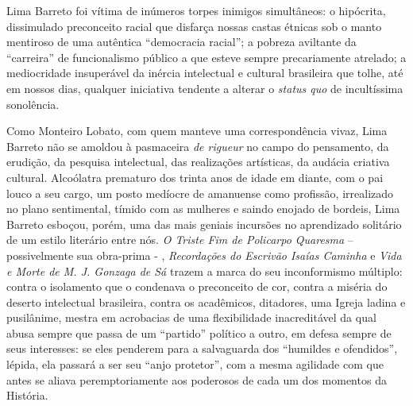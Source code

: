 \documentclass[
  letterpaper,
  DIV=11,
  numbers=noendperiod]{scrreprt}
\begin{document}
Lima Barreto foi vítima de inúmeros torpes inimigos simultâneos: o
hipócrita, dissimulado preconceito racial que disfarça nossas castas
étnicas sob o manto mentiroso de uma autêntica ``democracia racial''; a
pobreza aviltante da ``carreira'' de funcionalismo público a que esteve
sempre precariamente atrelado; a mediocridade insuperável da inércia
intelectual e cultural brasileira que tolhe, até em nossos dias,
qualquer iniciativa tendente a alterar o \emph{status quo} de
incultíssima sonolência.

Como Monteiro Lobato, com quem manteve uma correspondência vivaz, Lima
Barreto não se amoldou à pasmaceira \emph{de rigueur} no campo do
pensamento, da erudição, da pesquisa intelectual, das realizações
artísticas, da audácia criativa cultural. Alcoólatra prematuro dos
trinta anos de idade em diante, com o pai louco a seu cargo, um posto
medíocre de amanuense como profissão, irrealizado no plano sentimental,
tímido com as mulheres e saindo enojado de bordeis, Lima Barreto
esboçou, porém, uma das mais geniais incursões no aprendizado solitário
de um estilo literário entre nós. \emph{O Triste Fim de Policarpo
Quaresma} -- possivelmente sua obra-prima - , \emph{Recordações do
Escrivão Isaías Caminha} e \emph{Vida e Morte de M. J. Gonzaga de Sá}
trazem a marca do seu inconformismo múltiplo: contra o isolamento que o
condenava o preconceito de cor, contra a miséria do deserto intelectual
brasileira, contra os acadêmicos, ditadores, uma Igreja ladina e
pusilânime, mestra em acrobacias de uma flexibilidade inacreditável da
qual abusa sempre que passa de um ``partido'' político a outro, em
defesa sempre de seus interesses: se eles penderem para a salvaguarda
dos ``humildes e ofendidos'', lépida, ela passará a ser seu ``anjo
protetor'', com a mesma agilidade com que antes se aliava
peremptoriamente aos poderosos de cada um dos momentos da História.
\end{document}
